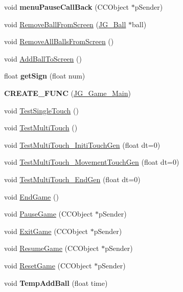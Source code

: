 \begin{DoxyCompactItemize}
\item 
\hypertarget{class_j_g___game___main_a2e2740b51a8e5ac7b981078dbd7bbd70}{void {\bfseries menu\-Pause\-Call\-Back} (C\-C\-Object $\ast$p\-Sender)}\label{class_j_g___game___main_a2e2740b51a8e5ac7b981078dbd7bbd70}

\item 
void \hyperlink{class_j_g___game___main_adc1658ea07b4deb55bfe22df04b61aa2}{Remove\-Ball\-From\-Screen} (\hyperlink{class_j_g___ball}{J\-G\-\_\-\-Ball} $\ast$ball)
\item 
void \hyperlink{class_j_g___game___main_a3b5871764fe94896c274e2a072c00dda}{Remove\-All\-Balls\-From\-Screen} ()
\item 
void \hyperlink{class_j_g___game___main_ae827327aa2c6e58cee824a6f5010f5fe}{Add\-Ball\-To\-Screen} ()
\item 
\hypertarget{class_j_g___game___main_aa386bd7cdada1f23b0b32526e67cc2b0}{float {\bfseries get\-Sign} (float num)}\label{class_j_g___game___main_aa386bd7cdada1f23b0b32526e67cc2b0}

\item 
\hypertarget{class_j_g___game___main_ad94a26b81515a717556314a3a8c65b31}{{\bfseries C\-R\-E\-A\-T\-E\-\_\-\-F\-U\-N\-C} (\hyperlink{class_j_g___game___main}{J\-G\-\_\-\-Game\-\_\-\-Main})}\label{class_j_g___game___main_ad94a26b81515a717556314a3a8c65b31}

\item 
void \hyperlink{class_j_g___game___main_ad4691efc615e12254ea347a7b21cd167}{Test\-Single\-Touch} ()
\item 
void \hyperlink{class_j_g___game___main_a5ad7dc858f795f34d33c13b712880b43}{Test\-Multi\-Touch} ()
\item 
void \hyperlink{class_j_g___game___main_a104c8ad94eb551ad2ba292aa46c0298c}{Test\-Multi\-Touch\-\_\-\-Initi\-Touch\-Gen} (float dt=0)
\item 
void \hyperlink{class_j_g___game___main_ae410c7d1cc74a9e7bf6bc51b525f889e}{Test\-Multi\-Touch\-\_\-\-Movement\-Touch\-Gen} (float dt=0)
\item 
void \hyperlink{class_j_g___game___main_ab2d7fb8240de8466d624a2f187d5eadf}{Test\-Multi\-Touch\-\_\-\-End\-Gen} (float dt=0)
\item 
void \hyperlink{class_j_g___game___main_a925a777f7a94c35b278434ff642b623b}{End\-Game} ()
\item 
void \hyperlink{class_j_g___game___main_a511aee5105b667f9d781030e1bdd7d16}{Pause\-Game} (C\-C\-Object $\ast$p\-Sender)
\item 
void \hyperlink{class_j_g___game___main_ad7a6bcb044fcd6f415bf005b8682de9b}{Exit\-Game} (C\-C\-Object $\ast$p\-Sender)
\item 
void \hyperlink{class_j_g___game___main_a0e1494d3e5c8c0a22f0d202716923839}{Resume\-Game} (C\-C\-Object $\ast$p\-Sender)
\item 
void \hyperlink{class_j_g___game___main_a186a53d9b5956462dd186a48adaf251c}{Reset\-Game} (C\-C\-Object $\ast$p\-Sender)
\item 
\hypertarget{class_j_g___game___main_abbbc10c904cdcba09260c925c36d0f22}{void {\bfseries Temp\-Add\-Ball} (float time)}\label{class_j_g___game___main_abbbc10c904cdcba09260c925c36d0f22}


\end{DoxyCompactItemize}
